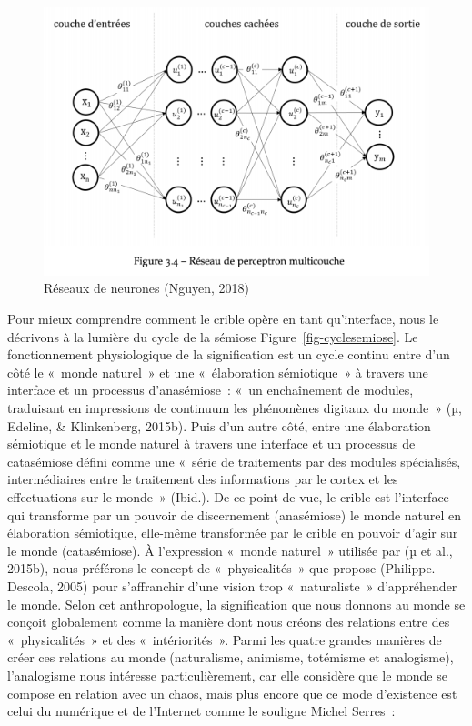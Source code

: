 \documentclass[
  a4paper,
  DIV=11,
  numbers=noendperiod]{scrreprt}
\begin{document}
\begin{figure}

{\centering \includegraphics{images/reseaux-neurones.png}

}

\caption{Réseaux de neurones (Nguyen, 2018)}

\end{figure}%

Pour mieux comprendre comment le crible opère en tant qu'interface, nous
le décrivons à la lumière du cycle de la sémiose
Figure~\ref{fig-cyclesemiose}. Le fonctionnement physiologique de la
signification est un cycle continu entre d'un côté le «~monde naturel~»
et une «~élaboration sémiotique~» à travers une interface et un
processus d'anasémiose~: «~un enchaînement de modules, traduisant en
impressions de continuum les phénomènes digitaux du monde~» (µ, Edeline,
\& Klinkenberg, 2015b). Puis d'un autre côté, entre une élaboration
sémiotique et le monde naturel à travers une interface et un processus
de catasémiose défini comme une «~série de traitements par des modules
spécialisés, intermédiaires entre le traitement des informations par le
cortex et les effectuations sur le monde~» (Ibid.). De ce point de vue,
le crible est l'interface qui transforme par un pouvoir de discernement
(anasémiose) le monde naturel en élaboration sémiotique, elle-même
transformée par le crible en pouvoir d'agir sur le monde (catasémiose).
À l'expression «~monde naturel~» utilisée par (µ et al., 2015b), nous
préférons le concept de «~physicalités~» que propose (Philippe. Descola,
2005) pour s'affranchir d'une vision trop «~naturaliste~» d'appréhender
le monde. Selon cet anthropologue, la signification que nous donnons au
monde se conçoit globalement comme la manière dont nous créons des
relations entre des «~physicalités~» et des «~intériorités~». Parmi les
quatre grandes manières de créer ces relations au monde (naturalisme,
animisme, totémisme et analogisme), l'analogisme nous intéresse
particulièrement, car elle considère que le monde se compose en relation
avec un chaos, mais plus encore que ce mode d'existence est celui du
numérique et de l'Internet comme le souligne Michel Serres~:
\end{document}
